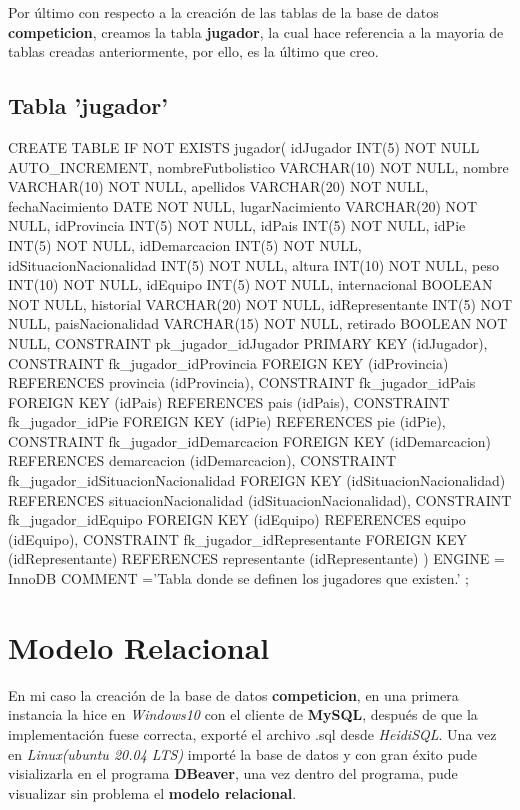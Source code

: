 \documentclass{article}
\begin{document}
  Por último con respecto a la creación de las tablas de la base de datos \textbf{competicion}, creamos la tabla \textbf{jugador}, la cual hace referencia a la mayoria 
  de tablas creadas anteriormente, por ello, es la último que creo.

\newpage
  \subsection{Tabla 'jugador'}
    \begin{listing}[style=C]
      CREATE TABLE IF NOT EXISTS jugador(
        idJugador INT(5) NOT NULL AUTO_INCREMENT,
        nombreFutbolistico VARCHAR(10) NOT NULL,
        nombre VARCHAR(10) NOT NULL,
        apellidos VARCHAR(20) NOT NULL,
        fechaNacimiento DATE NOT NULL,
        lugarNacimiento VARCHAR(20) NOT NULL,
        idProvincia INT(5) NOT NULL,
        idPais INT(5) NOT NULL,
        idPie INT(5) NOT NULL,
        idDemarcacion INT(5) NOT NULL,
        idSituacionNacionalidad INT(5) NOT NULL,
        altura INT(10) NOT NULL,
        peso INT(10) NOT NULL,
        idEquipo INT(5) NOT NULL,
        internacional BOOLEAN NOT NULL,
        historial VARCHAR(20) NOT NULL,
        idRepresentante INT(5) NOT NULL,
        paisNacionalidad VARCHAR(15) NOT NULL,
        retirado BOOLEAN NOT NULL,
        CONSTRAINT pk_jugador_idJugador PRIMARY KEY (idJugador),
        CONSTRAINT fk_jugador_idProvincia FOREIGN KEY (idProvincia) REFERENCES provincia (idProvincia),
        CONSTRAINT fk_jugador_idPais FOREIGN KEY (idPais) REFERENCES pais (idPais),
        CONSTRAINT fk_jugador_idPie FOREIGN KEY (idPie) REFERENCES pie (idPie),
        CONSTRAINT fk_jugador_idDemarcacion FOREIGN KEY (idDemarcacion) REFERENCES demarcacion (idDemarcacion),
        CONSTRAINT fk_jugador_idSituacionNacionalidad FOREIGN KEY (idSituacionNacionalidad) REFERENCES situacionNacionalidad (idSituacionNacionalidad),
        CONSTRAINT fk_jugador_idEquipo FOREIGN KEY (idEquipo) REFERENCES equipo (idEquipo),
        CONSTRAINT fk_jugador_idRepresentante FOREIGN KEY (idRepresentante) REFERENCES representante (idRepresentante)
      )
      ENGINE = InnoDB
      COMMENT ='Tabla donde se definen los jugadores que existen.'
      ;
    \end{listing}
\newpage
  \section{Modelo Relacional}
    En mi caso la creación de la base de datos \textbf{competicion}, en una primera instancia la hice en \textit{Windows10} con el cliente de \textbf{MySQL}, 
    después de que la implementación fuese correcta, exporté el archivo .sql desde \textit{HeidiSQL}. Una vez en \textit{Linux(ubuntu 20.04 LTS)} importé la 
    base de datos y con gran éxito pude visializarla en el programa \textbf{DBeaver}, una vez dentro del programa, pude visualizar sin problema el \textbf{modelo relacional}.
\end{document}
